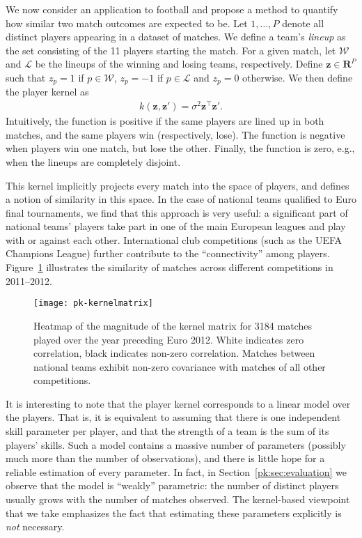 We now consider an application to football and propose a method to quantify how similar two match outcomes are expected to be.
Let $1, \dots, P$ denote all distinct players appearing in a dataset of matches.
We define a team's \emph{lineup} as the set consisting of the \num{11} players starting the match.
For a given match, let $\mathcal{W}$ and $\mathcal{L}$ be the lineups of the winning and losing teams, respectively.
Define $\bm{z} \in \mathbf{R}^P$ such that $z_p = 1$ if $p \in \mathcal{W}$, $z_p = -1$ if $p \in \mathcal{L}$ and $z_p = 0$ otherwise.
We then define the player kernel as
\begin{align*}
k(\bm{z}, \bm{z}') = \sigma^2 \bm{z}^\top \bm{z}'.
\end{align*}
Intuitively, the function is positive if the same players are lined up in both matches, and the same players win (respectively, lose).
The function is negative when players win one match, but lose the other.
Finally, the function is zero, e.g., when the lineups are completely disjoint.

This kernel implicitly projects every match into the space of players, and defines a notion of similarity in this space.
In the case of national teams qualified to Euro final tournaments, we find that this approach is very useful: a significant part of national teams' players take part in one of the main European leagues and play with or against each other.
International club competitions (such as the UEFA Champions League) further contribute to the ``connectivity'' among players.
Figure~\ref{pk:fig:kernel} illustrates the similarity of matches across different competitions in 2011--2012.


\begin{figure}
  \centering
  \texttt{[image: pk-kernelmatrix]}
  \caption{Heatmap of the magnitude of the kernel matrix for \num{3184} matches played over the year preceding Euro 2012.
White indicates zero correlation, black indicates non-zero correlation.
Matches between national teams exhibit non-zero covariance with matches of all other competitions.
}
  \label{pk:fig:kernel}
\end{figure}

It is interesting to note that the player kernel corresponds to a linear model over the players.
That is, it is equivalent to assuming that there is one independent skill parameter per player, and that the strength of a team is the sum of its players' skills.
Such a model contains a massive number of parameters (possibly much more than the number of observations), and there is little hope for a reliable estimation of every parameter.
In fact, in Section~\ref{pk:sec:evaluation} we observe that the model is ``weakly'' parametric: the number of distinct players usually grows with the number of matches observed.
The kernel-based viewpoint that we take emphasizes the fact that estimating these parameters explicitly is \emph{not} necessary.


